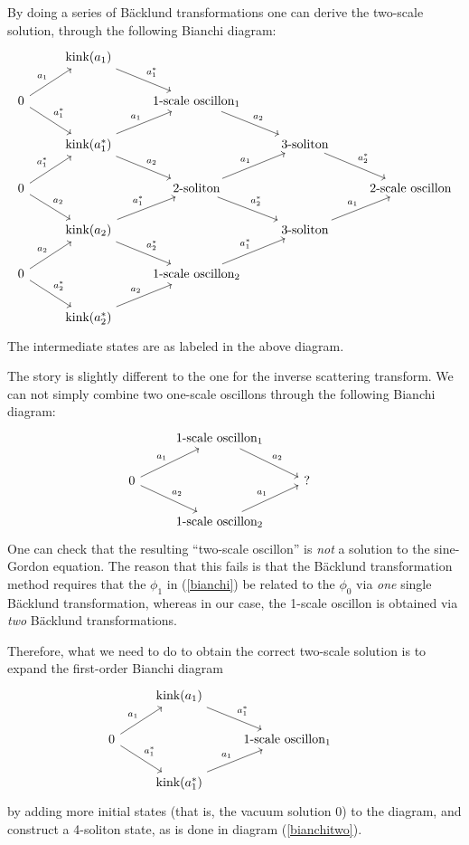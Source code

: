 \documentclass{report}
\begin{document}
By doing a series of B\"acklund transformations one can derive the two-scale solution, through the following Bianchi diagram:
\begin{equation}\label{bianchitwo}
\begin{tikzcd}
  & \text{kink}(a_1) \arrow{dr}{a_1^*} &&\\
 0 \arrow{ur}{a_1} \arrow{dr}{a_1^*} & &\text{1-scale oscillon}_1\arrow{dr}{a_2}&\\
  & \text{kink}(a_1^*) \arrow{ur}{a_1} \arrow{dr}{a_2} && \text{3-soliton}\arrow{dr}{a_2^*}&\\
 0 \arrow{ur}{a_1^*} \arrow{dr}{a_2} &&\text{2-soliton}\arrow{ur}{a_1}\arrow{dr}{a_2^*}&&\text{2-scale oscillon}\\
 &\text{kink}(a_2)\arrow{ur}{a_1^*}\arrow{dr}{a_2^*}&&\text{3-soliton}\arrow{ur}{a_1}\\
 0\arrow{ur}{a_2}\arrow{dr}{a_2^*}&&\text{1-scale oscillon}_2\arrow{ur}{a_1^*}\\
 &\text{kink}(a_2^*)\arrow{ur}{a_2}&&
\end{tikzcd}
\end{equation}
The intermediate states are as labeled in the above diagram.

The story is slightly different to the one for the inverse scattering transform. We can not simply combine two one-scale oscillons through the following Bianchi diagram:
\[
\begin{tikzcd}
  & \text{1-scale oscillon}_1 \arrow{dr}{a_2} &&\\
  0 \arrow{ur}{a_1} \arrow{dr}{a_2} & &?&\\
  &\text{1-scale oscillon}_2 \arrow{ur}{a_1}&&
\end{tikzcd}
\]
One can check that the resulting ``two-scale oscillon'' is \emph{not} a solution to the sine-Gordon equation. The reason that this fails is that the B\"acklund transformation method requires that the $\phi_1$ in (\ref{bianchi}) be related to the $\phi_0$ via \emph{one} single B\"acklund transformation, whereas in our case, the 1-scale oscillon is obtained via \emph{two} B\"acklund transformations.

Therefore, what we need to do to obtain the correct two-scale solution is to expand the first-order Bianchi diagram
\[
\begin{tikzcd}
  & \text{kink}(a_1) \arrow{dr}{a_1^*} &&\\
 0 \arrow{ur}{a_1} \arrow{dr}{a_1^*} & &\text{1-scale oscillon}_1&\\
   & \text{kink}(a_1^*) \arrow{ur}{a_1} &&
\end{tikzcd}
\]
by adding more initial states (that is, the vacuum solution $0$) to the diagram, and construct a 4-soliton state, as is done in diagram (\ref{bianchitwo}).
\end{document}
